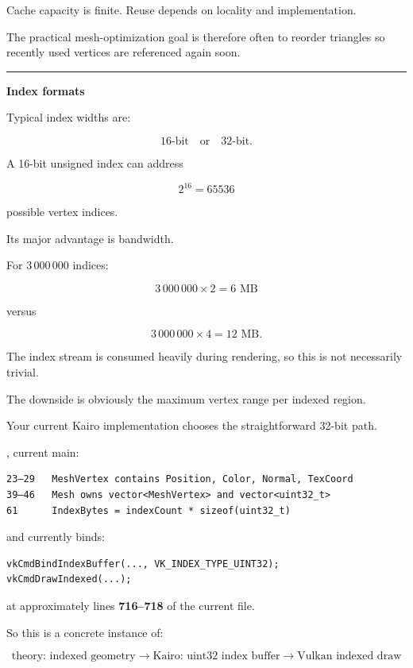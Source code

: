 Cache capacity is finite. Reuse depends on locality and implementation.

The practical mesh-optimization goal is therefore often to reorder triangles so recently used vertices are referenced again soon.

\begin{center}\rule{0.5\linewidth}{0.5pt}\end{center}

\textbf{Index formats}

Typical index widths are:

\[
16\text{-bit} \quad \text{or} \quad 32\text{-bit}.
\]

A 16-bit unsigned index can address

\[
2^{16}=65536
\]

possible vertex indices.

Its major advantage is bandwidth.

For \(3\,000\,000\) indices:

\[
3\,000\,000\times2 = 6\text{ MB}
\]

versus

\[
3\,000\,000\times4 = 12\text{ MB}.
\]

The index stream is consumed heavily during rendering, so this is not necessarily trivial.

The downside is obviously the maximum vertex range per indexed region.

Your current Kairo implementation chooses the straightforward 32-bit path.

, current main:

\begin{verbatim}
23–29   MeshVertex contains Position, Color, Normal, TexCoord
39–46   Mesh owns vector<MeshVertex> and vector<uint32_t>
61      IndexBytes = indexCount * sizeof(uint32_t)
\end{verbatim}

and  currently binds:

\begin{verbatim}
vkCmdBindIndexBuffer(..., VK_INDEX_TYPE_UINT32);
vkCmdDrawIndexed(...);
\end{verbatim}

at approximately lines \textbf{716--718} of the current file.

So this is a concrete instance of:

\[
\boxed{\text{theory: indexed geometry}
\rightarrow
\text{Kairo: uint32 index buffer}
\rightarrow
\text{Vulkan indexed draw}}
\]

